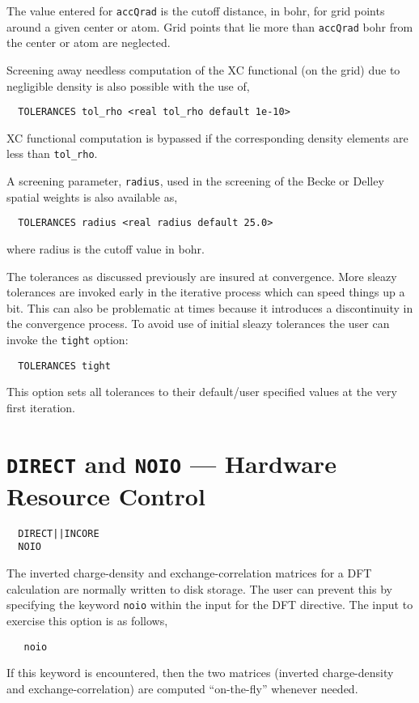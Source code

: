 The value entered for \verb+accQrad+ is the cutoff distance, in bohr, for grid
points around a given center or atom.  Grid points that lie more than 
\verb+accQrad+ bohr from the center or atom are neglected. 

Screening away needless computation of the XC functional (on the grid)
due to negligible density is also possible with the use of,
\begin{verbatim}
  TOLERANCES tol_rho <real tol_rho default 1e-10>
\end{verbatim}
XC functional computation is bypassed if the corresponding density
elements are less than \verb+tol_rho+.

A screening parameter, \verb+radius+, used in the screening of the
Becke or Delley spatial weights is also available as,
\begin{verbatim}
  TOLERANCES radius <real radius default 25.0>
\end{verbatim}
where radius is the cutoff value in bohr.

The tolerances as discussed previously are insured at convergence.
More sleazy tolerances are invoked early in the iterative process
which can speed things up a bit.  This can also be problematic at
times because it introduces a discontinuity in the convergence
process.  To avoid use of initial sleazy tolerances the user can
invoke the \verb+tight+ option:

\begin{verbatim}
  TOLERANCES tight 
\end{verbatim}

This option sets all tolerances to their
default/user specified values at the very first iteration.


\section{{\tt DIRECT} and {\tt NOIO} --- Hardware Resource Control}
\begin{verbatim}
  DIRECT||INCORE
  NOIO
\end{verbatim}

\sloppy

The inverted charge-density and exchange-correlation matrices
for a DFT calculation are normally written to disk storage.  The user
can prevent this by specifying the keyword \verb+noio+ within the
input for the DFT directive.  The input to exercise this option is
as follows,
\begin{verbatim}
   noio
\end{verbatim}
If this keyword is encountered, then the two matrices (inverted
charge-density and exchange-correlation) are computed ``on-the-fly''
whenever needed.  

